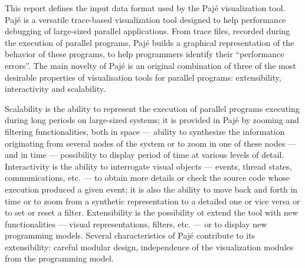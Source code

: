 
This report defines the input data format used by the Pajé
visualization tool. Pajé is a versatile trace-based visualization tool
designed to help performance debugging of large-sized parallel
applications. From trace files, recorded during the execution of
parallel programs, Pajé builds a graphical representation of the
behavior of these programs, to help programmers identify their
``performance errors''. The main novelty of Pajé is an original
combination of three of the most desirable properties of visualisation
tools for parallel programs: extensibility, interactivity and
scalability. 

Scalability is the ability to represent the execution of
parallel programs executing during long periods on large-sized
systems; it is provided in Pajé by zooming and filtering
functionalities, both in space --- ability to synthesize the
information originating from several nodes of the system or to zoom in
one of these nodes --- and in time --- possibility to display  period
of time at various levels of detail. Interactivity is the ability to
interrogate visual objects --- events, thread states, communications,
etc. --- to obtain more details or check the source code whose
execution produced a given event; it is also the ability to move back
and forth in time or to zoom from a synthetic representation to a
detailed one or vice versa or to set or reset a filter. Extensibility
is the possibility ot extend the tool with new functionalities ---
visual representations, filters, etc. --- or to display new
programming models. Several characteristics of Pajé contribute to its
extensibility: careful modular design, independence of the
visualization modules from the programming model.

